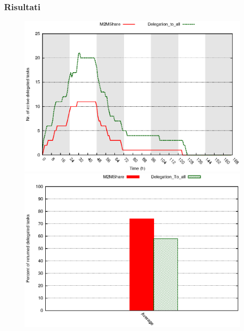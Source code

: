 \documentclass{beamer}
\begin{document}
\begin{frame}
\frametitle{Risultati}
\begin{figure}[ht]
\begin{minipage}[b]{0.4\linewidth}
\centering
\includegraphics[scale=0.4]{../grafici/delegheAttive.eps}
\end{minipage}



\begin{minipage}[b]{0.4\linewidth}
\centering
\pause
\includegraphics[scale=0.4]{../grafici/percDeleghe.eps}
\end{minipage}

\end{figure}
\end{frame}
\end{document}
